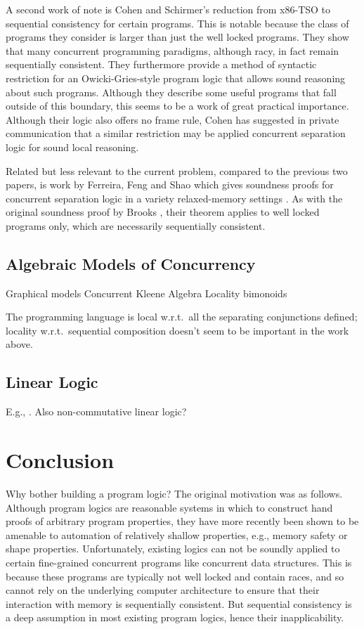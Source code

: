 \documentclass[11pt]{report}
\begin{document}
A second work of note is Cohen and Schirmer's \cite{DBLP:conf/itp/CohenS10} reduction from x86-TSO to sequential consistency for certain programs. This is notable because the class of programs they consider is larger than just the well locked programs. They show that many concurrent programming paradigms, although racy, in fact remain sequentially consistent. They furthermore provide a method of syntactic restriction for an Owicki-Gries-style program logic that allows sound reasoning about such programs. Although they describe some useful programs that fall outside of this boundary, this seems to be a work of great practical importance. Although their logic also offers no frame rule, Cohen has suggested in private communication that a similar restriction may be applied concurrent separation logic for sound local reasoning.

Related but less relevant to the current problem, compared to the previous two papers, is work by Ferreira, Feng and Shao which gives soundness proofs for concurrent separation logic in a variety relaxed-memory settings \cite{DBLP:conf/esop/FerreiraFS10}. As with the original soundness proof by Brooks \cite{DBLP:journals/tcs/Brookes07}, their theorem applies to well locked programs only, which are necessarily sequentially consistent. 

\section{Algebraic Models of Concurrency}

Graphical models \cite{DBLP:journals/ipl/WehrmanHO09} Concurrent Kleene Algebra \cite{DBLP:conf/RelMiCS/HoareMSW09,DBLP:conf/concur/HoareMSW09} Locality bimonoids \cite{DBLP:conf/concur/HoareHMOPS11} 

The programming language is local w.r.t.\ all the separating conjunctions defined; locality w.r.t.\ sequential composition doesn't seem to be important in the work above.  


\section{Linear Logic}

E.g., \cite{Girard95logic}. Also non-commutative linear logic? 

\chapter{Conclusion}
 Why bother building a program logic? The original motivation was as follows. Although program logics are reasonable systems in which to construct hand proofs of arbitrary program properties, they have more recently been shown to be amenable to automation of relatively shallow properties, e.g., memory safety or shape properties. Unfortunately, existing logics can not be soundly applied to certain fine-grained concurrent programs like concurrent data structures. This is because these programs are typically not well locked and contain races, and so cannot rely on the underlying computer architecture to ensure that their interaction with memory is sequentially consistent. But sequential consistency is a deep assumption in most existing program logics, hence their inapplicability.
\end{document}
